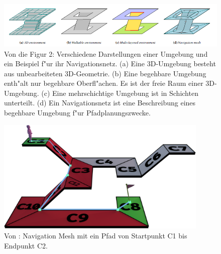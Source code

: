 \begin{figure}[H] %
	\centering
	\includegraphics[width=\textwidth]{images/navigation_mesh_16.png}
	\caption{Von \cite[~S. 93]{Mesh:16} die Figur 2: Verschiedene Darstellungen einer Umgebung und ein Beispiel f"ur ihr Navigationsnetz. (a) Eine 3D-Umgebung besteht aus unbearbeiteten 3D-Geometrie. (b) Eine begehbare Umgebung enth"alt nur begehbare Oberfl"achen. Es ist der freie Raum einer 3D-Umgebung. (c) Eine mehrschichtige Umgebung ist in Schichten unterteilt. (d) Ein Navigationsnetz ist eine Beschreibung eines begehbare Umgebung f"ur Pfadplanungszwecke.}
	\label{sec1a}
\end{figure}
\begin{figure}[H] %
	\centering
	\includegraphics[width=0.9\textwidth]{images/mesh_with_path.png}
	\caption{Von \cite{Mesh:18}: Navigation Mesh mit ein Pfad von Startpunkt C1 bis Endpunkt C2.}
	\label{sec1b}
\end{figure}


